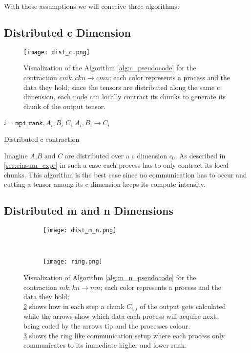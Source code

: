 With those assumptions we will conceive three algorithms:

\subsection{Distributed c Dimension}

\begin{figure}[ht]
    \centering\texttt{[image: dist\_c.png]} 
    \caption{Visualization of the Algorithm \ref{alg:c_pseudocode} for the contraction $cmk,ckn \rightarrow cmn$; 
    each color represents a process and the data they hold; 
    since the tensors are distributed along the same c dimension, each node can locally contract its chunks to generate its chunk of the output tensor.}
    \label{fig:c_algo}
    \end{figure}

\begin{algorithm}[ht]
    \begin{algorithmic}
    \Require $i = \texttt{mpi\_rank}, A_i, B_i$
    \Ensure $C_i$
    \State $A_i, B_i \rightarrow C_i$
\end{algorithmic}
\caption{Distributed c contraction}
\label{alg:c_pseudocode}
\end{algorithm}

Imagine $A$,$B$ and $C$ are distributed over a c dimension $c_0$.
As described in \ref{sec:einsum_expr} in such a case each process has to only contract its local chunks.
This algorithm is the best case since no communication has to occur and cutting a tensor among its c dimension keeps its compute intensity.

\subsection{Distributed m and n Dimensions}


\begin{figure}[ht]
    \centering
    \begin{subfigure}[t]{0.7\textwidth}
        \centering
        \texttt{[image: dist\_m\_n.png]}
        \label{fig:m_n_algo_a}
    \end{subfigure}
    ~
    \begin{subfigure}[t]{0.25\textwidth}
        \centering\texttt{[image: ring.png]}
        \label{fig:m_n_algo_b}
    \end{subfigure}
    
    \caption{Visualization of Algorithm \ref{alg:m_n_pseudocode} for the contraction $mk,kn\rightarrow mn$; 
    each color represents a process and the data they hold;\\
    \ref{fig:m_n_algo_a} shows how in each step a chunk $C_{i,j}$ of the output gets calculated while the arrows show which data each process will acquire next, being coded by the arrows tip and the processes colour.\\
    \ref{fig:m_n_algo_b} shows the ring like communication setup where each process only communicates to its immediate higher and lower rank.
    }
    \label{fig:m_n_algo}
\end{figure}
    

